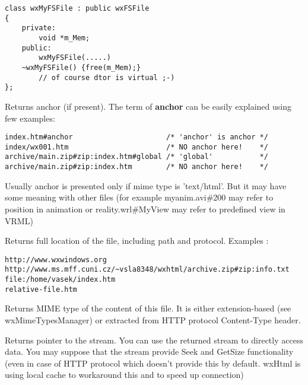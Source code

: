 \begin{verbatim}
class wxMyFSFile : public wxFSFile
{
    private:
        void *m_Mem;
    public:
        wxMyFSFile(.....)
	~wxMyFSFile() {free(m_Mem);}
	    // of course dtor is virtual ;-)
};
\end{verbatim}

\label{wxfsfilegetanchor}


Returns anchor (if present). The term of {\bf anchor} can be easily
explained using few examples:

\begin{verbatim}
index.htm#anchor                      /* 'anchor' is anchor */
index/wx001.htm                       /* NO anchor here!    */
archive/main.zip#zip:index.htm#global /* 'global'           */
archive/main.zip#zip:index.htm        /* NO anchor here!    */
\end{verbatim}

Usually anchor is presented only if mime type is 'text/html'.
But it may have some meaning with other files
(for example myanim.avi\#200 may refer to position in animation
or reality.wrl\#MyView may refer to predefined view in VRML)

\label{wxfsfilegetlocation}


Returns full location of the file, including path and protocol. 
Examples : 

\begin{verbatim}
http://www.wxwindows.org
http://www.ms.mff.cuni.cz/~vsla8348/wxhtml/archive.zip#zip:info.txt
file:/home/vasek/index.htm
relative-file.htm
\end{verbatim}

\label{wxfsfilegetmimetype}


Returns MIME type of the content of this file. It is either
extension-based (see wxMimeTypesManager) or extracted from
HTTP protocol Content-Type header.

\label{wxfsfilegetstream}


Returns pointer to the stream. You can use the returned
stream to directly access data. You may suppose
that the stream provide Seek and GetSize functionality
(even in case of HTTP protocol which doesn't provide
this by default. wxHtml is using local cache to workaround
this and to speed up connection)

